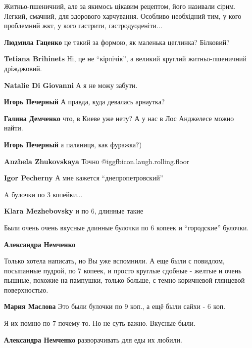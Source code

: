 \begin{itemize}
\begin{itemize}
\begin{itemize}
Житньо-пшеничний, але за якимось цікавим рецептом, його називали сірим. Легкий,
смачний, для здорового харчування. Особливо необхідний тим, у кого проблемний
жкт, у кого гастрити, гастродуоденіти...


\textbf{Людмила Гаценко} це такий за формою, як маленька цеглинка? Білковий?

\textbf{Tetiana Brihinets}
Ні, це не \enquote{кірпічік}, а великий круглий житньо-пшеничний дріжджовий.

\textbf{Natalie Di Giovanni}
А я не можу забути.

\textbf{Игорь Печерный} А правда, куда девалась арнаутка?

\textbf{Галина Демченко} что, в Киеве уже нету? А у нас в Лос Анджелесе можно найти.

\textbf{Игорь Печерный} а паляниця, как фуражка?)

\textbf{Anzhela Zhukovskaya}
Точно @igg{fbicon.laugh.rolling.floor} 

\textbf{Igor Pecherny} А мне кажется \enquote{днепропетровский}
\end{itemize} %

\end{itemize} %

A булочки по 3 копейки...

\textbf{Klara Mezhebovsky} и по 6, длинные такие

Были очень очень вкусные длинные булочки по 6 копеек и \enquote{городские} булочки.

\begin{itemize} %
\textbf{Александра Немченко} 

Только хотела написать, но Вы уже вспомнили. А еще были с повидлом, посыпанные
пудрой, по 7 копеек, и просто круглые сдобные - желтые и очень пышные, похожие
на пампушки, только больше, с темно-коричневой глянцевой поверхностью.

\textbf{Мария Маслова} Это были булочки по 9 коп., а ещё были сайхи - 6 коп.

Я их помню по 7 почему-то. Но не суть важно. Вкусные были.

\textbf{Александра Немченко} разворачивать для еды их любили.
\end{itemize} %


\end{itemize}
